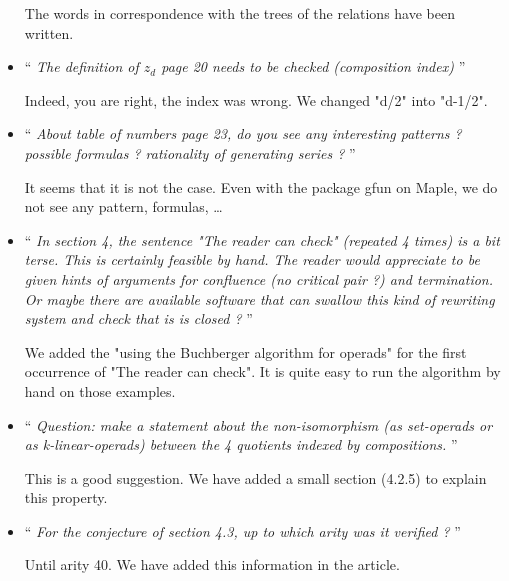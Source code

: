 \documentclass[11pt,reqno]{amsart}
\numberwithin{equation}{subsection}
\begin{document}
\begin{itemize}
The words in correspondence with the trees of the relations have been
written.
\medbreak

\item `` {\it
The definition of $z_d$ page 20 needs to be checked (composition index)
}''
\smallbreak

Indeed, you are right, the index was wrong. We changed "d/2" into
"d-1/2".
\medbreak

\item `` {\it
About table of numbers page 23, do you see any interesting patterns ?
possible formulas ? rationality of generating series ?
}''
\smallbreak

It seems that it is not the case. Even with the package gfun on
Maple, we do not see any pattern, formulas, \dots
\medbreak

\item `` {\it
In section 4, the sentence "The reader can check" (repeated 4 times)
is a bit terse. This is certainly feasible by hand. The reader would
appreciate to be given hints of arguments for confluence (no critical
pair ?) and termination. Or maybe there are available software that
can swallow this kind of rewriting system and check that is is closed ?
}''
\smallbreak

We added the "using the Buchberger algorithm for operads" for the first
occurrence of "The reader can check". It is quite easy to run the
algorithm by hand on those examples.
\medbreak

\item `` {\it
Question: make a statement about the non-isomorphism (as set-operads
or as k-linear-operads) between the 4 quotients indexed by compositions.
}''
\smallbreak

This is a good suggestion. We have added a small section (4.2.5) to
explain this property.
\medbreak

\item `` {\it
For the conjecture of section 4.3, up to which arity was it verified ?
}''
\smallbreak

Until arity 40. We have added this information in the article.
\medbreak

\end{itemize}
\end{document}
